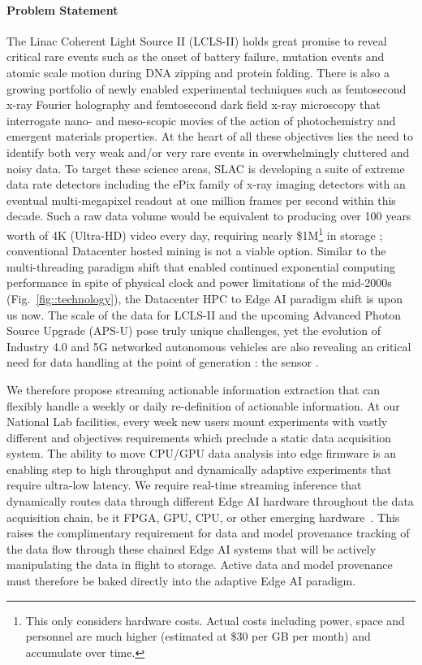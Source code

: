 \documentclass{article}
\begin{document}
\paragraph{Problem Statement}%
The Linac Coherent Light Source II (LCLS-II) holds great promise to reveal critical rare events such as the onset of battery failure, mutation events and atomic scale motion during DNA zipping and protein folding.
There is also a growing portfolio of newly enabled experimental techniques such as femtosecond x-ray Fourier holography \cite{Tais2018} and femtosecond dark field x-ray microscopy \cite{Simons2015} that interrogate nano- and meso-scopic movies of the action of photochemistry and emergent materials properties.
At the heart of all these objectives lies the need to identify both very weak and/or very rare events in overwhelmingly cluttered and noisy data. 
To target these science areas, SLAC is developing a suite of extreme data rate detectors including the ePix family of x-ray imaging detectors with an eventual multi-megapixel readout at one million frames per second within this decade.
Such a raw data volume would be equivalent to producing over 100 years worth of 4K (Ultra-HD) video \cite{HowBigVideo} every day, requiring nearly \$1M\footnote{This only considers hardware costs. Actual costs including power, space and personnel are much higher (estimated at \$30 per GB per month) and accumulate over time.} in storage \cite{CostPerTB}; conventional Datacenter hosted mining is not a viable option.
Similar to the multi-threading paradigm shift that enabled continued exponential computing performance in spite of physical clock and power limitations of the mid-2000s (Fig.~\ref{fig::technology}), the Datacenter HPC to Edge AI paradigm shift is upon us now.
The scale of the data for LCLS-II and the upcoming Advanced Photon Source Upgrade (APS-U) pose truly unique challenges, yet the evolution of Industry 4.0 and 5G networked autonomous vehicles are also revealing an critical need for data handling at the point of generation : the sensor \cite{Gartner2018,NetworkWorld2019}.

We therefore propose streaming actionable information extraction that can flexibly handle a weekly or daily re-definition of actionable information.
At our National Lab facilities, every week new users mount experiments with vastly different and objectives requirements which preclude a static data acquisition system. 
The ability to move CPU/GPU data analysis into edge firmware is an enabling step to high throughput and dynamically adaptive experiments that require ultra-low latency.
We require real-time streaming inference that dynamically routes data through different Edge AI hardware throughout the data acquisition chain, be it FPGA, GPU, CPU, or other emerging hardware~\cite{edgetpu_benchmarks,edgetpu,waveCGRA,CGRAreview,seaofcores}.
This raises the complimentary requirement for data and model provenance tracking of the data flow through these chained Edge AI systems that will be actively manipulating the data in flight to storage.
Active data and model provenance must therefore be baked directly into the adaptive Edge AI paradigm.
\end{document}
